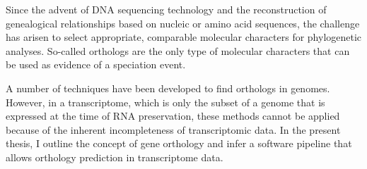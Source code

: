 Since the advent of DNA sequencing technology and the reconstruction of
genealogical relationships based on nucleic or amino acid sequences, the
challenge has arisen to select appropriate, comparable molecular characters for
phylogenetic analyses. So-called orthologs are the only type of molecular characters
that can be used as evidence of a speciation event. 

A number of techniques have been developed to find orthologs in genomes.
However, in a transcriptome, which is only the subset of a genome that is expressed at the
time of RNA preservation, these methods cannot be applied because of the inherent
incompleteness of transcriptomic data. In the present thesis, I outline the
concept  of gene orthology and infer a software pipeline that allows orthology
prediction in transcriptome data.

